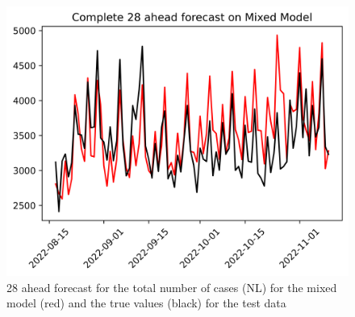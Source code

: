 \begin{figure}
\begin{minipage}{.32\textwidth}
  \label{fig:tot_cases_fc_28_mvnn_DE}
\end{minipage}
\begin{minipage}{.32\textwidth}
  \centering
  \includegraphics[width=\linewidth]{pics/28_ah/Complete_28_ahead_Mixed Model.png}
  \caption{28 ahead forecast for the total number of cases (NL) for the mixed model (red) and the true values (black) for the test data}
  \label{fig:tot_cases_fc_28_mix}
\end{minipage}

\end{figure}


